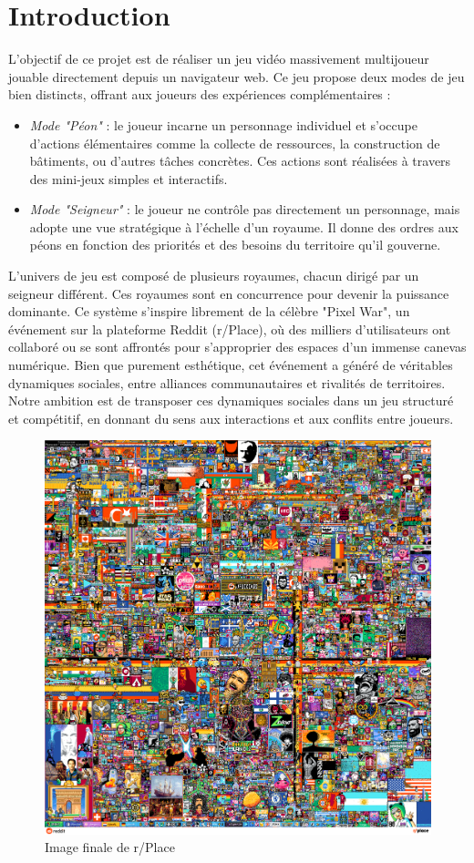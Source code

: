 \section{Introduction}

L'objectif de ce projet est de réaliser un jeu vidéo massivement multijoueur jouable directement depuis un navigateur web. Ce jeu propose deux modes de jeu bien distincts, offrant aux joueurs des expériences complémentaires :

\begin{itemize}
    \item \textit{Mode "Péon"} : le joueur incarne un personnage individuel et s’occupe d’actions élémentaires comme la collecte de ressources, la construction de bâtiments, ou d'autres tâches concrètes. Ces actions sont réalisées à travers des mini-jeux simples et interactifs.
    \item \textit{Mode "Seigneur"} : le joueur ne contrôle pas directement un personnage, mais adopte une vue stratégique à l’échelle d’un royaume. Il donne des ordres aux péons en fonction des priorités et des besoins du territoire qu’il gouverne.
\end{itemize}

L’univers de jeu est composé de plusieurs royaumes, chacun dirigé par un seigneur différent. Ces royaumes sont en concurrence pour devenir la puissance dominante. Ce système s'inspire librement de la célèbre "Pixel War", un événement sur la plateforme Reddit (r/Place)\cite{r/Place}, où des milliers d'utilisateurs ont collaboré ou se sont affrontés pour s’approprier des espaces d’un immense canevas numérique. Bien que purement esthétique, cet événement a généré de véritables dynamiques sociales, entre alliances communautaires et rivalités de territoires. Notre ambition est de transposer ces dynamiques sociales dans un jeu structuré et compétitif, en donnant du sens aux interactions et aux conflits entre joueurs.



\begin{figure}[!h]
   \centering
    \includegraphics[width=0.5\linewidth]{images/pixelwar.png}
    \caption{Image finale de r/Place}
    \label{fig:pixelwar}
\end{figure}


